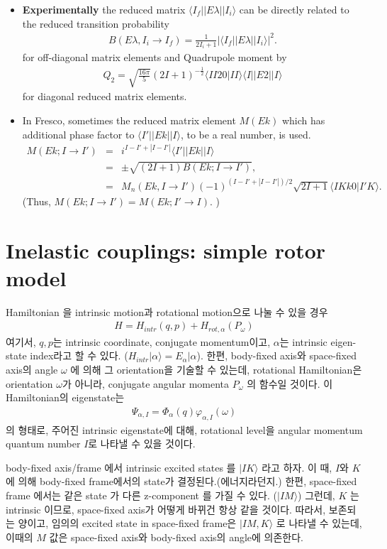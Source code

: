 \documentclass[11pt]{book}
\def\la{\langle}
\def\ra{\rangle}
\newcommand{\bea}{\begin{eqnarray}}
\newcommand{\eea}{\end{eqnarray}}
\newcommand{\no}{\nonumber \\}
\begin{document}
\begin{itemize}
\item {\bf Experimentally} the reduced matrix $\la I_f|| E\lambda|| I_i\ra$       
      can be directly related to the reduced transition probability
     \bea 
     B(E\lambda, I_i\to I_f)=\frac{1}{2I_i+1}|\la I_f||E\lambda||I_i\ra|^2.
     \eea 
     for off-diagonal matrix elements and Quadrupole moment by 
     \bea 
     Q_2=\sqrt{\frac{16\pi}{5}}(2I+1)^{-\frac{1}{2}}\la II 20|II\ra 
       \la I|| E2|| I\ra 
     \eea  
     for diagonal reduced matrix elements. 
\item In Fresco, sometimes the reduced matrix element $M(Ek)$ which has additional
     phase factor to $\la I'||Ek||I\ra$, to be a real number, is used. 
     \bea 
     M(Ek;I\to I')&=& i^{I-I'+|I-I'|}\la I'||Ek||I\ra \no 
                  &=& \pm \sqrt{(2I+1) B(Ek;I\to I')},\no 
                  &=& M_n(Ek,I\to I')(-1)^{(I-I'+|I-I'|)/2} 
                    \sqrt{2I+1}\la I K k 0|I' K\ra. 
     \eea  
     (Thus, $M(Ek;I\to I')=M(Ek;I'\to I)$.  )   
\end{itemize}



\section{Inelastic couplings: simple rotor model}
Hamiltonian 을 intrinsic motion과 rotational motion으로 나눌 수 있을 경우
\bea 
H=H_{intr}(q,p)+H_{rot,\alpha}(P_\omega)
\eea 
여기서, $q,p$는 intrinsic coordinate, conjugate momentum이고, 
$\alpha$는 intrinsic eigen-state index라고 할 수 있다. ($H_{intr}|\alpha\ra=E_\alpha|\alpha$).
한편, body-fixed axis와 space-fixed axis의 angle $\omega$ 에 의해 그 orientation을 
기술할 수 있는데, rotational Hamiltonian은 orientation $\omega$가 아니라, 
conjugate angular momenta $P_\omega$ 의 함수일 것이다. 
이 Hamiltonian의 eigenstate는 
\bea 
\Psi_{\alpha,I}=\Phi_\alpha(q)\varphi_{\alpha,I}(\omega)
\eea 
의 형태로, 주어진 intrinsic eigenstate에 대해, rotational level을 angular momentum quantum number 
$I$로 나타낼 수 있을 것이다. 

body-fixed axis/frame 에서 intrinsic excited states 를 $|I K\ra$ 라고 하자. 
이 때, $I$와 $K$에 의해 body-fixed frame에서의 state가 결정된다.(에너지라던지.)
한편, space-fixed frame 에서는 같은 state 가 다른 z-component 를 가질 수 있다. ($|I M\ra$)
그런데, $K$ 는 intrinsic 이므로, space-fixed axis가 어떻게 바뀌건 항상 같을 것이다. 
따라서, 보존되는 양이고, 임의의 excited state in space-fixed frame은 $|I M,K\ra$ 로 나타낼 수 있는데,
이때의 $M$ 값은 space-fixed axis와 body-fixed axis의 angle에 의존한다. 
\end{document}
